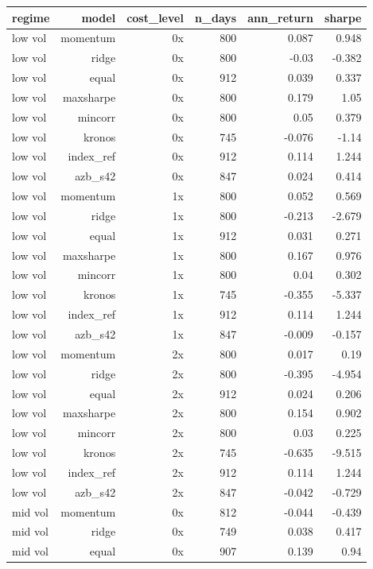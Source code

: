 \begin{center}\footnotesize\begin{longtable}{lrrrrr}
\toprule
regime & model & cost\_level & n\_days & ann\_return & sharpe \\
\midrule
low vol & momentum & 0x & 800 & 0.087 & 0.948 \\
low vol & ridge & 0x & 800 & -0.03 & -0.382 \\
low vol & equal & 0x & 912 & 0.039 & 0.337 \\
low vol & maxsharpe & 0x & 800 & 0.179 & 1.05 \\
low vol & mincorr & 0x & 800 & 0.05 & 0.379 \\
low vol & kronos & 0x & 745 & -0.076 & -1.14 \\
low vol & index\_ref & 0x & 912 & 0.114 & 1.244 \\
low vol & azb\_s42 & 0x & 847 & 0.024 & 0.414 \\
low vol & momentum & 1x & 800 & 0.052 & 0.569 \\
low vol & ridge & 1x & 800 & -0.213 & -2.679 \\
low vol & equal & 1x & 912 & 0.031 & 0.271 \\
low vol & maxsharpe & 1x & 800 & 0.167 & 0.976 \\
low vol & mincorr & 1x & 800 & 0.04 & 0.302 \\
low vol & kronos & 1x & 745 & -0.355 & -5.337 \\
low vol & index\_ref & 1x & 912 & 0.114 & 1.244 \\
low vol & azb\_s42 & 1x & 847 & -0.009 & -0.157 \\
low vol & momentum & 2x & 800 & 0.017 & 0.19 \\
low vol & ridge & 2x & 800 & -0.395 & -4.954 \\
low vol & equal & 2x & 912 & 0.024 & 0.206 \\
low vol & maxsharpe & 2x & 800 & 0.154 & 0.902 \\
low vol & mincorr & 2x & 800 & 0.03 & 0.225 \\
low vol & kronos & 2x & 745 & -0.635 & -9.515 \\
low vol & index\_ref & 2x & 912 & 0.114 & 1.244 \\
low vol & azb\_s42 & 2x & 847 & -0.042 & -0.729 \\
mid vol & momentum & 0x & 812 & -0.044 & -0.439 \\
mid vol & ridge & 0x & 749 & 0.038 & 0.417 \\
mid vol & equal & 0x & 907 & 0.139 & 0.94 \\

\end{longtable}
\end{center}
